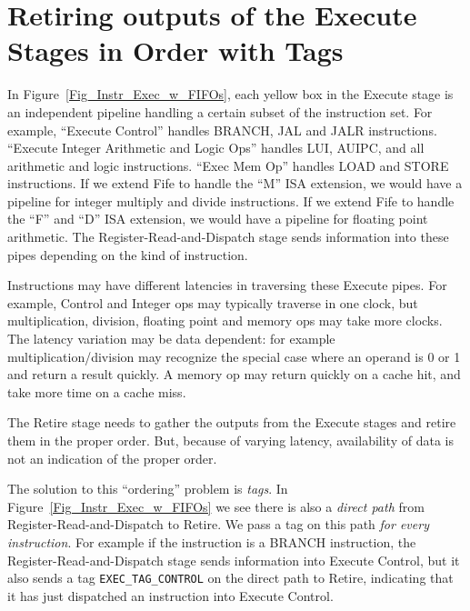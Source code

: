 
\section{Retiring outputs of the Execute Stages in Order with Tags}

\label{Sec_Reorder_Tags}


In Figure~\ref{Fig_Instr_Exec_w_FIFOs}, each yellow box in the Execute
stage is an independent pipeline handling a certain subset of the
instruction set.  For example, ``Execute Control'' handles BRANCH, JAL
and JALR instructions. ``Execute Integer Arithmetic and Logic Ops''
handles LUI, AUIPC, and all arithmetic and logic instructions.  ``Exec
Mem Op'' handles LOAD and STORE instructions.  If we extend Fife to
handle the ``M'' ISA extension, we would have a pipeline for integer
multiply and divide instructions.  If we extend Fife to handle the
``F'' and ``D'' ISA extension, we would have a pipeline for floating
point arithmetic.  The Register-Read-and-Dispatch stage sends
information into these pipes depending on the kind of instruction.

Instructions may have different latencies in traversing these Execute
pipes.  For example, Control and Integer ops may typically traverse in
one clock, but multiplication, division, floating point and memory ops
may take more clocks.  The latency variation may be data dependent:
for example multiplication/division may recognize the special case
where an operand is 0 or 1 and return a result quickly.  A memory op
may return quickly on a cache hit, and take more time on a cache miss.

The Retire stage needs to gather the outputs from the Execute stages
and retire them in the proper order.  But, because of varying latency,
availability of data is not an indication of the proper order.

The solution to this ``ordering'' problem is \emph{tags}.  In
Figure~\ref{Fig_Instr_Exec_w_FIFOs} we see there is also a
\emph{direct path} from Register-Read-and-Dispatch to Retire.  We pass
a tag on this path \emph{for every instruction}.  For example if the
instruction is a BRANCH instruction, the Register-Read-and-Dispatch
stage sends information into Execute Control, but it also sends a tag
\verb|EXEC_TAG_CONTROL| on the direct path to Retire, indicating that
it has just dispatched an instruction into Execute Control.

